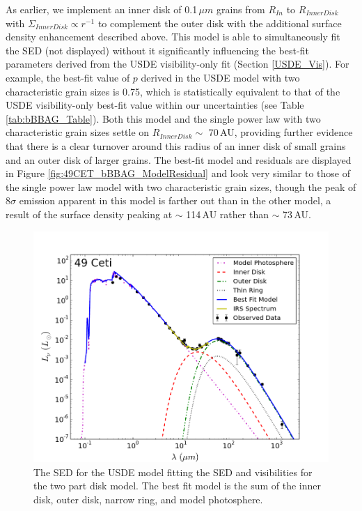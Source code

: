 As earlier, we implement an inner disk of 0.1$\,\mu m$ grains from $R_{In}$ to $R_{Inner Disk}$ with $\Sigma_{Inner Disk} \propto r^{-1}$ to complement the outer disk with the additional surface density enhancement described above. This model is able to simultaneously fit the SED (not displayed) without it significantly influencing the best-fit parameters derived from the USDE visibility-only fit (Section \ref{USDE_Vis}). For example, the best-fit value of $p$ derived in the USDE model with two characteristic grain sizes is 0.75, which is statistically equivalent to that of the USDE visibility-only best-fit value within our uncertainties (see Table \ref{tab:bBBAG_Table}). Both this model and the single power law with two characteristic grain sizes settle on $R_{Inner Disk} \sim$ 70\,AU, providing further evidence that there is a clear turnover around this radius of an inner disk of small grains and an outer disk of larger grains. The best-fit model and residuals are displayed in Figure \ref{fig:49CET_bBBAG_ModelResidual} and look very similar to those of the single power law model with two characteristic grain sizes, though the peak of $8\sigma$ emission apparent in this model is farther out than in the other model, a result of the surface density peaking at $\sim$ 114\,AU rather than $\sim$ 73\,AU. 

\begin{figure}%
\label{fig:49CET_USDE_TWO_SED}
\centering
\includegraphics[width = \textwidth]{49CET_bBBAG_SED.png}
\caption{The SED for the USDE model fitting the SED and visibilities for the two part disk model. The best fit model is the sum of the inner disk, outer disk, narrow ring, and model photosphere. }
\label{fig:49CET_BonusBeltSED_ModelResidual}
\end{figure}



